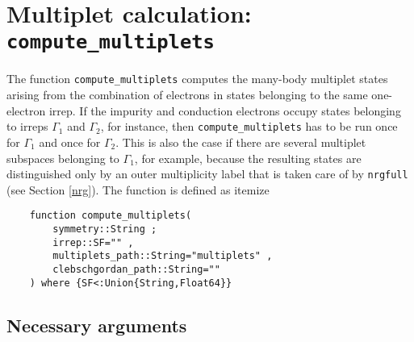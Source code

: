 \documentclass[notitlepage]{article}
\begin{document}
\section{Multiplet calculation: \texttt{compute\_multiplets}}
\label{multiplet_calculation}
The function \texttt{compute\_multiplets} computes the
many-body multiplet states arising from the combination of
electrons in states belonging to the same one-electron
irrep. If the impurity and conduction electrons occupy
states belonging to irreps $\Gamma_1$ and $\Gamma_2$, for
instance, then \texttt{compute\_multiplets} has to be run
once for $\Gamma_1$ and once for $\Gamma_2$. This is also
the case if there are several multiplet subspaces belonging
to $\Gamma_1$, for example, because the resulting states are
distinguished only by an outer multiplicity label that is
taken care of by \texttt{nrgfull} (see Section \ref{nrg}).
The function is defined as itemize
\begin{verbatim}
    function compute_multiplets( 
        symmetry::String ;
        irrep::SF="" ,
        multiplets_path::String="multiplets" ,
        clebschgordan_path::String=""
    ) where {SF<:Union{String,Float64}}
\end{verbatim}
\subsection{Necessary arguments}
\end{document}
